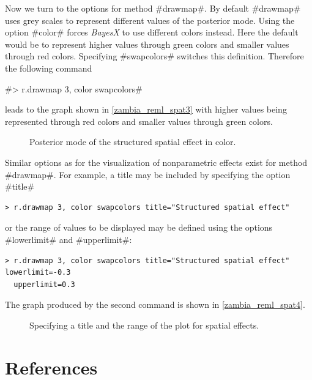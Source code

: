 Now we turn to the options for method #drawmap#. By default
#drawmap# uses grey scales to represent different values of the
posterior mode. Using the option #color# forces {\it BayesX} to
use different colors instead. Here the default would be to
represent higher values through green colors and smaller values
through red colors. Specifying #swapcolors# switches this
definition. Therefore the following command

#> r.drawmap 3, color swapcolors#

leads to the graph shown in \autoref{zambia_reml_spat3} with
higher values being represented through red colors and smaller
values through green colors.

\begin{figure}[ht]
\begin{center}
{\it\caption{Posterior mode of the structured spatial effect in
color.\label{zambia_reml_spat3}}}
\end{center}
\end{figure}


Similar options as for the visualization of nonparametric effects
exist for method #drawmap#. For example, a title may be included
by specifying the option #title#

\begin{verbatim}
> r.drawmap 3, color swapcolors title="Structured spatial effect"
\end{verbatim}

or the range of values to be displayed may be defined using the
options #lowerlimit# and #upperlimit#:

\begin{verbatim}
> r.drawmap 3, color swapcolors title="Structured spatial effect" lowerlimit=-0.3
  upperlimit=0.3
\end{verbatim}

The graph produced by the second command is shown in
\autoref{zambia_reml_spat4}.

\begin{figure}[ht]
\begin{center}
{\it\caption{Specifying a title and the range of the plot for
spatial effects.\label{zambia_reml_spat4}}}
\end{center}
\end{figure}

\section{References}
\label{remlregreferences}

